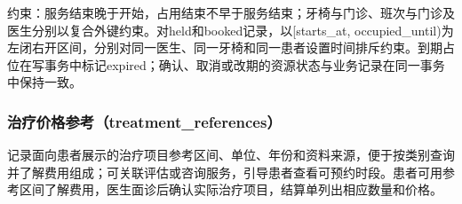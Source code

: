 \documentclass[UTF8,12pt,a4paper,fontset=none]{ctexart}
\begin{document}
约束：服务结束晚于开始，占用结束不早于服务结束；牙椅与门诊、班次与门诊及医生分别以复合外键约束。对held和booked记录，以[starts\_\allowbreak{}at,\allowbreak{} occupied\_\allowbreak{}until)\allowbreak{}为左闭右开区间，分别对同一医生、同一牙椅和同一患者设置时间排斥约束。到期占位在写事务中标记expired；确认、取消或改期的资源状态与业务记录在同一事务中保持一致。\par
\Needspace{506pt}
\subsubsection{治疗价格参考（treatment\_references）}
记录面向患者展示的治疗项目参考区间、单位、年份和资料来源，便于按类别查询并了解费用组成；可关联评估或咨询服务，引导患者查看可预约时段。患者可用参考区间了解费用，医生面诊后确认实际治疗项目，结算单列出相应数量和价格。\par
\end{document}
